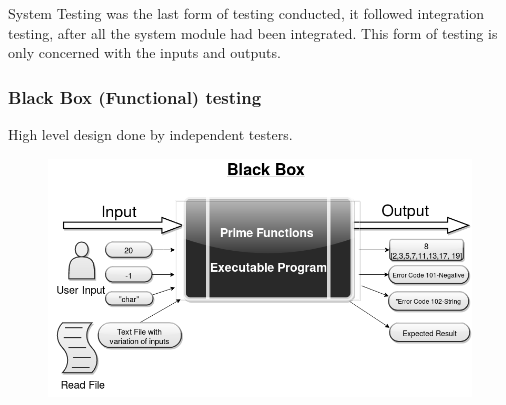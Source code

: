 \documentclass[11 pt]{article}
\begin{document}
System Testing was the last form of testing conducted, it followed integration testing, after all the system module had been integrated. This form of testing is only concerned with the inputs and outputs.
\subsubsection{Black Box (Functional) testing}
High level design done by independent testers.\\

    \begin{figure}[h]
    \centering
    
    \includegraphics[width=\linewidth]{Black Box Diagram.png}
    \end{figure}
 

 
\end{document}
